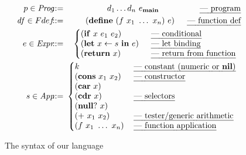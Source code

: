 \documentclass[9pt]{sigplanconf}
\newcommand{\ID}{\mbox{$\mathbf{ id}$}}
\begin{document}
\begin{figure}[t]\footnotesize
\renewcommand{\arraystretch}{1}
\begin{eqnarray*}
   p \in \mathit{Prog} & \!\!\!::=\!\!\! & d_1 \ldots d_n \,\, e_\mainpgm
    \hspace{5em} \mbox{\em --- program}\\
    \mathit{df} \in Fdef & \!\!\!::=\!\!\! & (\DEFINE\,\, (f\,\, x_1 \,\, \ldots
\,\,x_n)\,\,
    e)
    \hspace{0.2em} \ \ \ \ \mbox{\em --- function def} \\
e \in \mathit{Expr} & \!\!\!::=\!\!\! &
\left\{\begin{array}{@{}ll@{\hspace{1em}}l}
       (\SIF\,\, x\,\, e_1\,\, e_2) && \!\!\!\mbox{\em --- conditional} \\
       (\LET\,\, x \leftarrow s\,\, \IN\,\, e) &&\!\!\! \mbox{\em --- let
binding} \\
       (\SRETURN\,\, x) && \!\!\!\mbox{\em --- return from function}
    \end{array}\right. \\
s \in \mathit{App} & \!\!\!::=\!\!\!  &
\left\{\begin{array}{@{}l@{\hspace{1.2em}}l}
       k & \mbox{\em --- constant (numeric or $\NIL$)}\\
       (\CONS\,\, x_1\,\, x_2) & \mbox{\em --- constructor} \\
       (\CAR\,\, x) & \\
       (\CDR\,\, x) & \mbox{\em --- selectors} \\
       (\NULLQ\,\, x) & \\
       (\PRIM\,\, x_1\,\, x_2) & \mbox{\em ---  tester/generic arithmetic} \\
       (f\,\, x_1\,\,\ldots\,\, x_n) & \mbox{\em --- function application}
    \end{array}\right.
\end{eqnarray*}
  \caption{The syntax of our language}\label{fig:lang-syntax}
\figrule
\normalsize
\end{figure}
\end{document}
